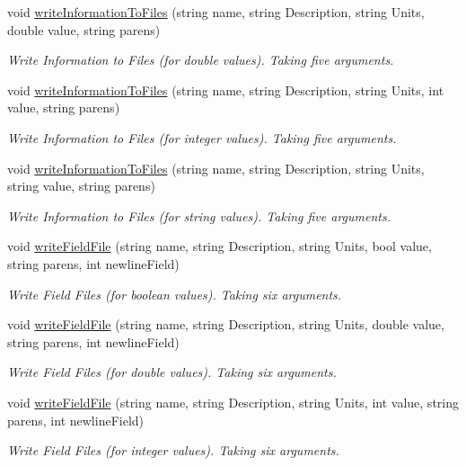 \begin{DoxyCompactItemize}
void \mbox{\hyperlink{class_global_vars_a1d78ceec4b54b5e794984056a7ee3176}{write\+Information\+To\+Files}} (string name, string Description, string Units, double value, string parens)
\begin{DoxyCompactList}\small\item\em Write Information to Files (for double values). Taking five arguments. \end{DoxyCompactList}\item 
void \mbox{\hyperlink{class_global_vars_aace79841247d2f8b681edb01a20c1872}{write\+Information\+To\+Files}} (string name, string Description, string Units, int value, string parens)
\begin{DoxyCompactList}\small\item\em Write Information to Files (for integer values). Taking five arguments. \end{DoxyCompactList}\item 
void \mbox{\hyperlink{class_global_vars_a8210169b90a265203bf08b21f3124bc0}{write\+Information\+To\+Files}} (string name, string Description, string Units, string value, string parens)
\begin{DoxyCompactList}\small\item\em Write Information to Files (for string values). Taking five arguments. \end{DoxyCompactList}\item 
void \mbox{\hyperlink{class_global_vars_a6650ac2c9d1d0bfadf6f9534908fe26c}{write\+Field\+File}} (string name, string Description, string Units, bool value, string parens, int newline\+Field)
\begin{DoxyCompactList}\small\item\em Write Field Files (for boolean values). Taking six arguments. \end{DoxyCompactList}\item 
void \mbox{\hyperlink{class_global_vars_aee04a8a38ee54e32a726917eedd10e8c}{write\+Field\+File}} (string name, string Description, string Units, double value, string parens, int newline\+Field)
\begin{DoxyCompactList}\small\item\em Write Field Files (for double values). Taking six arguments. \end{DoxyCompactList}\item 
void \mbox{\hyperlink{class_global_vars_a2a50c058535f9d35a368658c5831119b}{write\+Field\+File}} (string name, string Description, string Units, int value, string parens, int newline\+Field)
\begin{DoxyCompactList}\small\item\em Write Field Files (for integer values). Taking six arguments. \end{DoxyCompactList}\item 

\end{DoxyCompactItemize}
